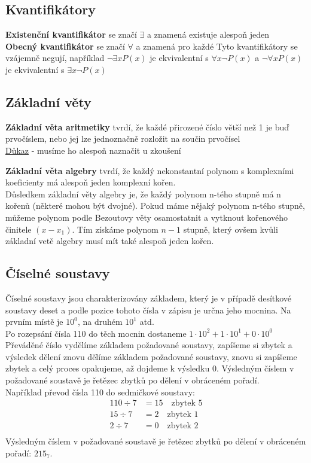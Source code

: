 \documentclass[12pt]{article}
\begin{document}
\subsection*{Kvantiﬁkátory}
\textbf{Existenční kvantifikátor} se značí $\exists$ a znamená existuje alespoň jeden\\
\textbf{Obecný kvantifikátor} se značí $\forall$ a znamená pro každé
Tyto kvantifikátory se vzájemně negují, například $\neg \exists x P(x)$ je ekvivalentní s $\forall x \neg P(x)$ a $\neg \forall x P(x)$ je ekvivalentní s $\exists x \neg P(x)$

\subsection*{Základní věty}
\textbf{Základní věta aritmetiky} tvrdí, že každé přirozené číslo větší než 1 je buď prvočíslem, nebo jej lze jednoznačně rozložit na součin prvočísel\\
\href{https://www.matweb.cz/zakladni-veta-aritmetiky/?value0=100&unit0=&outputUnit=}{\color{blue}Důkaz} - musíme ho alespoň naznačit u zkoušení

\textbf{Základní věta algebry} tvrdí, že každý nekonstantní polynom s komplexními koeficienty má
alespoň jeden komplexní kořen.\\
Důsledkem základní věty algebry je, že každý polynom n-tého stupně má n kořenů (některé mohou být
dvojné). Pokud máme nějaký polynom n-tého stupně, můžeme polynom podle Bezoutovy věty osamostatnit
a vytknout kořenového činitele $(x - x_1)$. Tím získáme polynom $n - 1$ stupně, který ovšem kvůli
základní vetě algebry musí mít také alespoň jeden kořen.

\subsection*{Číselné soustavy}
Číselné soustavy jsou charakterizovány základem, který je v případě desítkové soustavy deset a podle pozice tohoto čísla v zápisu je určna jeho mocnina. Na prvním místě je $10^0$, na druhém $10^1$ atd.\\
Po rozepsání čísla 110 do těch mocnin dostaneme $1 \cdot 10^2 + 1 \cdot 10^1 + 0 \cdot 10^0$\\ 
Převáděné číslo vydělíme základem požadované soustavy, zapíšeme si zbytek a výsledek dělení znovu dělíme základem požadované soustavy, znovu si zapíšeme zbytek a celý proces opakujeme, až dojdeme k výsledku 0. Výsledným číslem v požadované soustavě je řetězec zbytků po dělení v obráceném pořadí.\\
Například převod čísla 110 do sedmičkové soustavy:\\
\begin{align*}
110 \div 7 &= 15 \quad \text{zbytek } 5\\
15 \div 7 &= 2 \quad \text{zbytek } 1\\
2 \div 7 &= 0 \quad \text{zbytek } 2\\
\end{align*}
Výsledným číslem v požadované soustavě je řetězec zbytků po dělení v obráceném pořadí: $215_7$.
\end{document}
